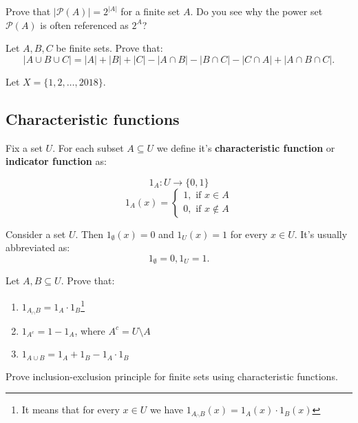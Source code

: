 \begin{exercise}
  Prove that $|\mathcal P(A)|=2^{|A|}$ for a finite set $A$. Do you see why the power set $\mathcal P(A)$ is often referenced as $2^A$?
\end{exercise}

\begin{exercise}
    Let $A,B,C$ be finite sets. Prove that:
		$$|A\cup B\cup C| = |A|+|B|+|C| - |A\cap B| - |B\cap C|-|C\cap A| + |A\cap B\cap C|.$$
\end{exercise}

\begin{exercise}
  Let $X=\{1,2,\dots, 2018\}$.
\end{exercise}

\subsection{Characteristic functions}
\begin{definition}
  Fix a set $U$. For each subset $A\subseteq U$ we define it's \textbf{characteristic function} or \textbf{indicator function} as:

  $$1_A: U\to \{0,1\}$$
  $$1_A(x) = \begin{cases}1, \text{ if } x\in A\\ 0, \text{ if } x\notin A\end{cases}$$
\end{definition}

\begin{example}
  Consider a set $U$. Then $1_\emptyset(x)=0$ and $1_U(x)=1$ for every $x\in U$. It's usually abbreviated as:
  $$1_\emptyset=0, 1_U=1.$$
\end{example}

\begin{exercise}
  Let $A,B\subseteq U$. Prove that:
  \begin{enumerate}
    \item $1_{A_\cap B}=1_A\cdot 1_B$\footnote{It means that for every $x\in U$ we have $1_{A_\cap B}(x)=1_A(x)\cdot 1_B(x)$}
    \item $1_{A^c}=1-1_A$, where $A^c=U\setminus A$
    \item $1_{A\cup B}=1_A+1_B-1_A\cdot 1_B$
  \end{enumerate}
\end{exercise}

\begin{exercise}
  Prove inclusion-exclusion principle for finite sets using characteristic functions. 
\end{exercise}

